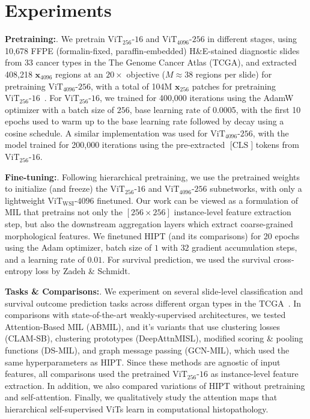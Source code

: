 {\section{Experiments}

\textbf{Pretraining:}. We pretrain $\operatorname{ViT_{256}\textrm{-}16}$ and $\operatorname{ViT_{4096}\textrm{-}256}$ in different stages, using 10,678 FFPE (formalin-fixed, paraffin-embedded) H\&E-stained diagnostic slides from 33 cancer types in the The Genome Cancer Atlas (TCGA), and extracted 408,218 $\textbf{x}_{4096}$ regions at an $20\times$ objective ($M \approx 38$ regions per slide) for pretraining $\operatorname{ViT_{4096}\textrm{-}256}$, with a total of 104M $\textbf{x}_{256}$ patches for pretraining $\operatorname{ViT_{256}\textrm{-}16}$~\cite{liu2018integrated}. For $\operatorname{ViT_{256}\textrm{-}16}$, we trained for 400,000 iterations using the AdamW optimizer with a batch size of $256$, base learning rate of 0.0005, with the first 10 epochs used to warm up to the base learning rate followed by decay using a cosine schedule. A similar implementation was used for $\operatorname{ViT_{4096}\textrm{-}256}$, with the model trained for 200,000 iterations using the pre-extracted $\operatorname{[CLS}]$ tokens from $\operatorname{ViT_{256}\textrm{-}16}$. 

\textbf{Fine-tuning:}. Following hierarchical pretraining, we use the pretrained weights to initialize (and freeze) the $\operatorname{ViT_{256}\textrm{-}16}$ and $\operatorname{ViT_{4096}\textrm{-}256}$ subnetworks, with only a lightweight $\operatorname{ViT_\text{WSI}\textrm{-}4096}$ finetuned. Our work can be viewed as a formulation of MIL that pretrains not only the $[256 \times 256]$ instance-level feature extraction step, but also the downstream aggregation layers which extract coarse-grained morphological features. We finetuned HIPT (and its comparisons) for 20 epochs using the Adam optimizer, batch size of $1$ with $32$ gradient accumulation steps, and a learning rate of $0.01$. For survival prediction, we used the survival cross-entropy loss by Zadeh \& Schmidt\cite{zadeh2020bias}.

\textbf{Tasks \& Comparisons:}. We experiment on several slide-level classification and survival outcome prediction tasks across different organ types in the TCGA~\cite{liu2018integrated}. In comparisons with state-of-the-art weakly-supervised architectures, we tested Attention-Based MIL (ABMIL), and it's variants that use clustering losses (CLAM-SB), clustering prototypes (DeepAttnMISL), modified scoring \& pooling functions (DS-MIL), and graph message passing (GCN-MIL), which used the same hyperparameters as HIPT. Since these methods are agnostic of input features, all comparisons used the pretrained $\operatorname{ViT_{256}\textrm{-}16}$ as instance-level feature extraction. In addition, we also compared variations of HIPT without pretraining and self-attention. Finally, we qualitatively study the attention maps that hierarchical self-supervised ViTs learn in computational histopathology.

}
